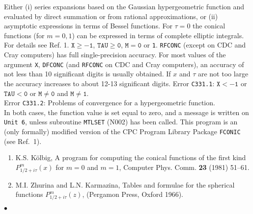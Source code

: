 \Method
Either (i) series expansions based on the Gaussian
hypergeometric function and evaluated by direct summation
or from rational approximations, or (ii) asymptotic
expressions in terms of Bessel functions. For $\tau =0$ the
conical functions (for $m = 0,1$) can be expressed in terms of
complete elliptic integrals.
For details see Ref. 1.
\Restrict
$\mathtt{X \ge -1}$, $\mathtt{TAU \ge 0}$, $\mathtt{M = 0}$ or {\tt 1}.
\newpage
\Accuracy
{\tt RFCONC} (except on CDC and Cray computers)
has full single-precision accuracy.
For most values of the argument {\tt X}, {\tt DFCONC}
(and {\tt RFCONC} on CDC and Cray computers), an accuracy of
not less than 10 significant digits is usually obtained.
If $x$ and $\tau$ are not too large
the accuracy increases to about 12-13 significant digits.
\Errorh
Error {\tt C331.1}: $\mathtt{X<-1}$ or $\mathtt{TAU<0}$ or
$\mathtt{M \ne 0}$ and $\mathtt{M \ne 1}$. \\
Error {\tt C331.2}: Problems of convergence for a hypergeometric
function. \\
In both cases, the function value is set equal to zero,
and a message is written on
{\tt Unit 6}, unless subroutine {\tt MTLSET} (N002) has been called.
\Notes
This program is an (only formally) modified version of the
CPC Program Library Package {\tt FCONIC} (see Ref.~1).
\Refer
\begin{enumerate}
\item K.S.  K\"olbig, A program for computing the conical
functions of the first kind $P^m_{1/2+i\tau}(x)$ for $m=0$
and $m=1$, Computer Phys. Comm. {\bf 23} (1981) 51--61.
\item M.I. Zhurina and L.N. Karmazina, Tables and
formulae for the spherical functions $P^m_{1/2+i\tau}(z)$,
(Pergamon Press, Oxford 1966).
\end{enumerate}
$\bullet$
